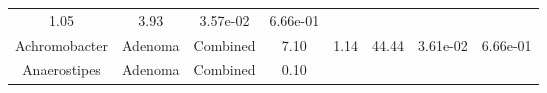 \documentclass[12pt,]{article}
\begin{document}
\begin{longtable}[]{@{}cccccccc@{}}
\begin{minipage}[t]{0.14\columnwidth}
1.05\strut
\end{minipage} & \begin{minipage}[t]{0.14\columnwidth}\centering\strut
3.93\strut
\end{minipage} & \begin{minipage}[t]{0.06\columnwidth}\centering\strut
3.57e-02\strut
\end{minipage} & \begin{minipage}[t]{0.06\columnwidth}\centering\strut
6.66e-01\strut
\end{minipage}\tabularnewline
\begin{minipage}[t]{0.18\columnwidth}\centering\strut
Achromobacter\strut
\end{minipage} & \begin{minipage}[t]{0.07\columnwidth}\centering\strut
Adenoma\strut
\end{minipage} & \begin{minipage}[t]{0.09\columnwidth}\centering\strut
Combined\strut
\end{minipage} & \begin{minipage}[t]{0.03\columnwidth}\centering\strut
7.10\strut
\end{minipage} & \begin{minipage}[t]{0.14\columnwidth}\centering\strut
1.14\strut
\end{minipage} & \begin{minipage}[t]{0.14\columnwidth}\centering\strut
44.44\strut
\end{minipage} & \begin{minipage}[t]{0.06\columnwidth}\centering\strut
3.61e-02\strut
\end{minipage} & \begin{minipage}[t]{0.06\columnwidth}\centering\strut
6.66e-01\strut
\end{minipage}\tabularnewline
\begin{minipage}[t]{0.18\columnwidth}\centering\strut
Anaerostipes\strut
\end{minipage} & \begin{minipage}[t]{0.07\columnwidth}\centering\strut
Adenoma\strut
\end{minipage} & \begin{minipage}[t]{0.09\columnwidth}\centering\strut
Combined\strut
\end{minipage} & \begin{minipage}[t]{0.03\columnwidth}\centering\strut
0.10\strut
\end{minipage} & \begin{minipage}[t]{0.14\columnwidth}\centering\strut

\end{minipage}
\end{longtable}
\end{document}
